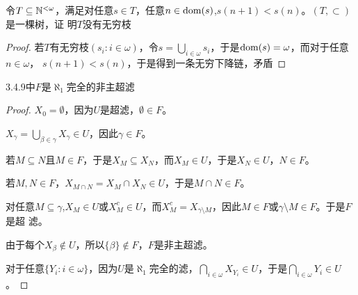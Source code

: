 \documentclass[11pt]{article}
\begin{document}
\begin{exercise}
令\(T\subseteq\mathbb{N}^{<\omega}\)，满足对任意\(s\in T\)，任意\(n\in\operatorname{dom}(s)\),\(s(n+1)<s(n)\)。\((T,\subset)\)是一棵树，证
明\(T\)没有无穷枝
\end{exercise}

\begin{proof}
若\(T\)有无穷枝\((s_i:i\in\omega)\)，令\(s=\bigcup_{i\in\omega} s_i\)，于是\(\operatorname{dom}(s)=\omega\)，而对于任意\(n\in\omega\)，
\(s(n+1)<s(n)\)，于是得到一条无穷下降链，矛盾
\end{proof}

\begin{exercise}
3.4.9中\(F\)是\(\aleph_1\)完全的非主超滤
\end{exercise}

\begin{proof}
\(X_0=\emptyset\)，因为\(U\)是超滤，\(\emptyset\in F\)。

\(X_\gamma=\bigcup_{\beta\in\gamma}X_\gamma\in U\)，因此\(\gamma\in F\)。

若\(M\subseteq N\)且\(M\in F\)，于是\(X_M\subseteq X_N\)，而\(X_M\in U\)，于是\(X_N\in U\)，\(N\in F\)。

若\(M,N\in F\)，\(X_{M\cap N}=X_M\cap X_N\in U\)，于是\(M\cap N\in F\)。

对任意\(M\subseteq\gamma\),\(X_M\in U\)或\(X_M^c\in U\)，而\(X_M^c=X_{\gamma\setminus M}\)，因此\(M\in F\)或\(\gamma\setminus M\in F\)。于是\(F\)是超
滤。

由于每个\(X_\beta\notin U\)，所以\(\{\beta\}\notin F\)，\(F\)是非主超滤。

对于任意\(\{Y_i:i\in\omega\}\)，因为\(U\)是\(\aleph_1\)完全的滤，\(\bigcap_{i\in\omega}X_{Y_i}\in U\)，于是\(\bigcap_{i\in\omega}Y_i\in U\)。
\end{proof}
\end{document}
